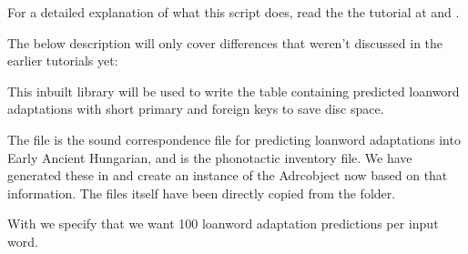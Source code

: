 \documentclass[letterpaper,10pt,english]{sphinxmanual}
\begin{document}
\sphinxAtStartPar
For a detailed explanation of what this script does, read the the tutorial at
 and .

\sphinxAtStartPar
The below description will only cover differences that weren’t discussed
in the earlier tutorials yet:

\begin{sphinxVerbatim}[commandchars=\\\{\}]
 
\end{sphinxVerbatim}

\sphinxAtStartPar
This inbuilt library will be used to write the table 
containing predicted loanword adaptations with short primary and foreign
keys to save disc space.

\begin{sphinxVerbatim}[commandchars=\\\{\}]
   
  
\end{sphinxVerbatim}

\sphinxAtStartPar
The file  is the sound correspondence file for
predicting loanword adaptations into Early Ancient Hungarian, and
 is the phonotactic inventory file.
We have generated these in 
and create an instance of the Adrc\sphinxhyphen{}object now based on that
information.
The files itself have been directly copied from the
 folder.

\sphinxAtStartPar
With  we specify that we want 100 loanword adaptation
predictions per input word.

\begin{sphinxVerbatim}[commandchars=\\\{\}]
 
       
         
       
\end{sphinxVerbatim}
\end{document}
